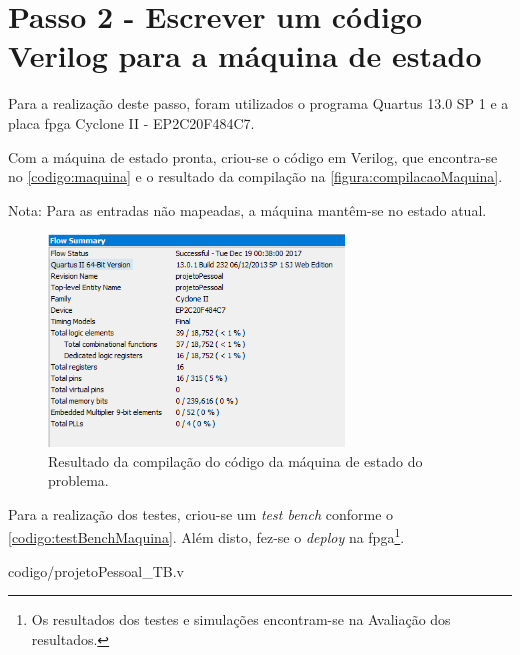 	\section{Passo 2 - Escrever um código Verilog para a máquina de estado}
		Para a realização deste passo, foram utilizados o programa Quartus 13.0 SP 1
		 e a placa \ac{fpga} Cyclone II - EP2C20F484C7.

		Com a máquina de estado pronta, criou-se o código em Verilog, que encontra-se no \autoref{codigo:maquina} e o resultado da
		compilação na \autoref{figura:compilacaoMaquina}.

		
		Nota: Para as entradas não mapeadas, a máquina mantêm-se no estado atual.

		\begin{figure}[H]
			 \centering
			 \caption{\label{figura:compilacaoMaquina}Resultado da compilação do código da máquina de
			  estado do problema.}
			 \includegraphics[width=0.7\textwidth]{img/compilacao}
		\end{figure}

		Para a realização dos testes, criou-se um \textit{test bench} conforme o \autoref{codigo:testBenchMaquina}.
		Além disto, fez-se o \textit{deploy} na \ac{fpga}\footnote{Os resultados dos
		 testes e simulações encontram-se na Avaliação dos resultados.}.

		
		{codigo/projetoPessoal_TB.v}




